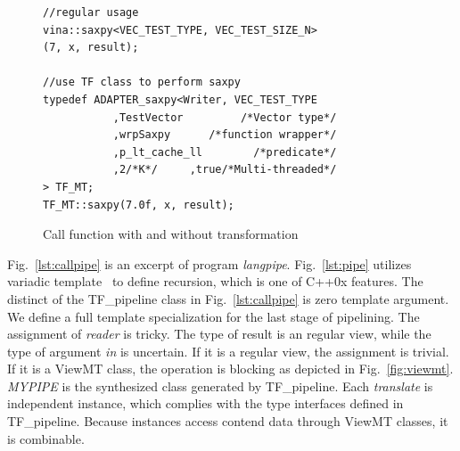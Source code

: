 \documentclass[10pt, conference, compsocconf]{IEEEtran}
\begin{document}
\begin{figure}[!htp]
\begin{minipage}[tb]{\linewidth}
\makebox[\textwidth]{\hrulefill}
\begin{small}
\begin{verbatim}
//regular usage
vina::saxpy<VEC_TEST_TYPE, VEC_TEST_SIZE_N>
(7, x, result);
  
//use TF class to perform saxpy
typedef ADAPTER_saxpy<Writer, VEC_TEST_TYPE 
           ,TestVector         /*Vector type*/
           ,wrpSaxpy      /*function wrapper*/
           ,p_lt_cache_ll        /*predicate*/
           ,2/*K*/     ,true/*Multi-threaded*/
> TF_MT;
TF_MT::saxpy(7.0f, x, result);
\end{verbatim}
\end{small}
\vspace{-1ex}\makebox[\textwidth]{\hrulefill}
\end{minipage}
\caption{Call function with and without transformation}\label{lst:callsaxpy}
\end{figure}
Fig.~\ref{lst:callpipe} is an excerpt of program \textit{langpipe}. 
Fig.~\ref{lst:pipe} utilizes variadic template~\cite{vartemp} to
define recursion, which is one of C++0x features. The distinct of the
TF\_pipeline class in Fig.~\ref{lst:callpipe} is zero template
argument. We define a full template specialization for the last stage
of pipelining. The assignment of \textit{reader} is tricky. The type of
result is an regular view, while the type of argument \textit{in} is
uncertain. If it is a regular view, the assignment is trivial. If it is
a ViewMT class, the operation is blocking as depicted in Fig.~\ref{fig:viewmt}. \textit{MYPIPE} is the
synthesized class generated by TF\_pipeline. Each
\textit{translate} is independent instance, which complies with the
type interfaces defined in TF\_pipeline. Because instances access
contend data through ViewMT classes, it is combinable.
\end{document}
